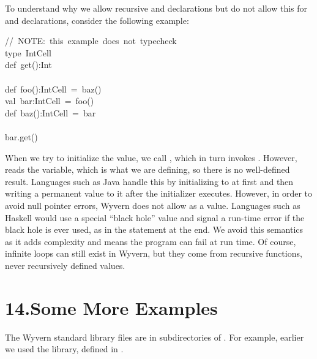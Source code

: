 \documentclass{article}
\begin{document}
To understand why we allow recursive  and  declarations
but do not allow this for  and  declarations, consider
the following example:%
\begin{mdpre}%
\noindent//~NOTE:~this~example~does~not~typecheck\\
type~IntCell\\
def~get():Int\\
\\
def~foo():IntCell~=~baz()\\
val~bar:IntCell~=~foo()\\
def~baz():IntCell~=~bar\\
\\
bar.get()%
\end{mdpre}\noindent{}When we try to initialize the  value, we call , which in
turn invokes .  However,  reads the  variable, which
is what we are defining, so there is no well-defined result.  Languages
such as Java handle this by initializing  to  at first and
then writing a permanent value to it after the initializer executes.
However, in order to avoid null pointer errors, Wyvern does not allow
 as a value.  Languages such as Haskell would use a special
\textquotedblleft{}black hole\textquotedblright{} value and signal a run-time error if the black hole is
ever used, as in the  statement at the end.
We avoid this semantics as it adds complexity and means the
program can fail at run time.  Of course, infinite loops can still
exist in Wyvern, but they come from recursive functions, never
recursively defined values.

\section{14.\hspace*{0.5em}Some More Examples}\label{sec-some-more-examples}%

\noindent{}The Wyvern standard library files are in subdirectories of .  For example, earlier we used the  library, defined in .%
\end{document}
